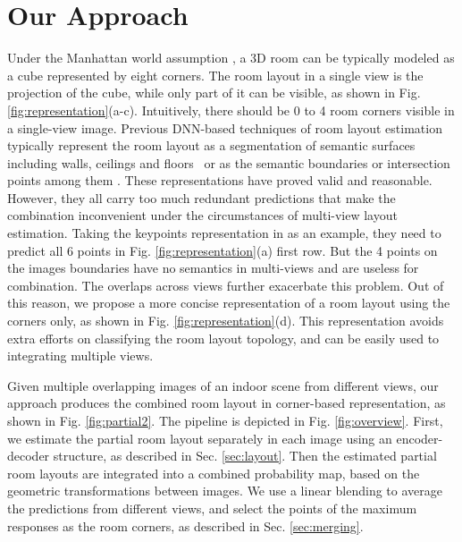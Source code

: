 \section{Our Approach}


Under the Manhattan world assumption \cite{coughlan1999manhattan}, a 3D room can be typically modeled as a cube represented by eight corners.
The room layout in a single view is the projection of the cube, while only part of it can be visible, as shown in Fig. \ref{fig:representation}(a-c). 
Intuitively, there should be 0 to 4 room corners visible in a single-view image. 
%
Previous DNN-based techniques of room layout estimation typically represent the room layout as a segmentation of semantic surfaces including walls, ceilings and floors~\cite{dasgupta2016delay} or as the semantic boundaries or intersection points among them \cite{ren2016coarse,zhao2017physics,LeeRoomNet17}. 
%
These representations have proved valid and reasonable. 
However, they all carry too much redundant predictions that make the combination inconvenient under the circumstances of multi-view layout estimation. Taking the keypoints representation in \cite{LeeRoomNet17} as an example, they need to predict all 6 points in Fig. \ref{fig:representation}(a) first row. But the 4 points on the images boundaries have no semantics in multi-views and are useless for combination. The overlaps across views further exacerbate this problem. Out of this reason, we propose a more concise representation of a room layout using the corners only, as shown in Fig. \ref{fig:representation}(d). 
This representation avoids extra efforts on classifying the room layout topology, and can be easily used to integrating multiple views.
%


%

Given multiple overlapping images of an indoor scene from different views, our approach produces the combined room layout in corner-based representation, as shown in Fig. \ref{fig:partial2}. The pipeline is depicted in Fig. \ref{fig:overview}. 
%
First, we estimate the partial room layout separately in each image using an encoder-decoder structure, as described in Sec. \ref{sec:layout}. 
Then the estimated partial room layouts are integrated into a combined probability map, based on the geometric transformations between images. 
We use a linear blending to average the predictions from different views, and select the points of the maximum responses as the room corners, as described in Sec. \ref{sec:merging}. 

